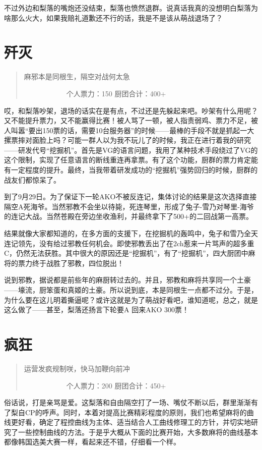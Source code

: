 不过外边和梨落的嘴炮还没结束，梨落也愤然退群。说真话我真的没想明白梨落为啥那么火大，如果我赔礼道歉还不行的话，我是不是该从萌战退场了？


\chapter{歼灭}
\begin{quote}
麻邪本是同根生，隔空对战何太急

　　　　　　个人票力：150 厨团合计：400+
\end{quote}

哎，和梨落吵架，退场的话实在是有点，不过还是先躲起来吧。吵架有什么用呢？又不能提升票力，又不能赢得比赛！被人骂了一顿，被人指责弱鸡、票力不足，被人叫嚣“要出150票的话，需要10台服务器”的时候——最棒的手段不就是抓起一大摞票摔对面脸上吗？可能一群人以为我不玩儿了的时候，我正在进行着我的研究——研发代号“挖掘机”。首先是VG的语言问题，我用了某种技术手段绕过了VG的这个限制，实现了任意语言的断线重连再拿票。有了这个功能，厨群的票力肯定能有一定程度的提升。最终，当我带着研发成功的“挖掘机”强势回归的时候，厨群的战友们都惊呆了。

到了9月29日。为了保证下一轮AKO不被反连记，集体讨论的结果是这次选择直接隔空A死海爷。当然邪教不会坐以待毙，死连琴里，形成了兔子-雪乃对琴里-海爷的连记大战。当然苍殿在旁边坐收渔利，并最终拿下了500+的二回战第一高票。

结果就像大家都知道的，在多方面的支援下，在挖掘机的轰鸣中，兔子和雪乃全天连记领先，没有给过邪教任何机会。即使邪教丢出了在2ch惹来一片骂声的超多重C，仍然无法获胜。其中很大的原因还是“挖掘机”，有了“挖掘机”，四大厨团中麻将的票力终于战胜了邪教，四位脱出！

说到邪教，据说都是前些年的麻厨转过去的。并且，邪教和麻将共享同一个土豪——壕流，厨笨蛋和真姬的土豪。所以说到底，本是同根生一点都不过分。于是，为什么要在这儿明着撕逼呢？或许这就是为了萌战好看吧，谁知道呢，总之，就是这么做了——甚至，梨落还扬言下轮要A 回来AKO 300票！


\chapter{疯狂}
\begin{quote}
运营发疯规制咲，快马加鞭向前冲

　　　　　　个人票力：200 厨团合计：450+
\end{quote}

俗话说，打是亲骂是爱。这梨落和自由隔空打了一场、嘴仗不断以后，群里渐渐有了梨自CP的呼声。同时，本着对提高比赛精彩程度的原则，我们也希望麻将的曲线更好看，确定了程控曲线为主体、适当结合人工曲线修理工的方针，并切实地研究了一些控制曲线的方法。于是乎大概从下面的比赛开始，大多数麻将的曲线基本都像韩国选美大赛一样，看起来还不错，仔细看一个样。

